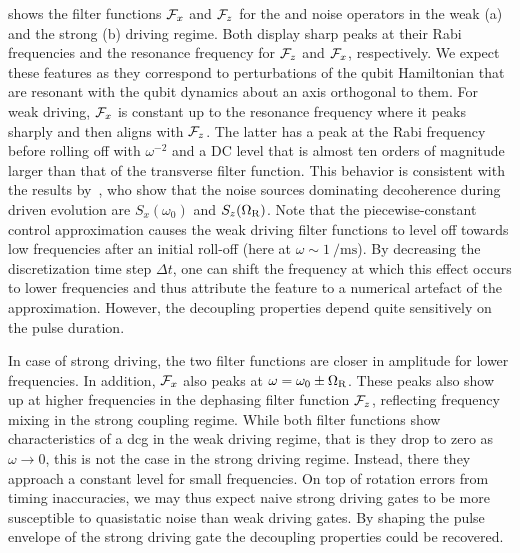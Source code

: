  shows the filter functions $\mathcal{F}_{x}$ and $\mathcal{F}_{z}$ for the \sx and \sz noise operators in the weak (a) and the strong (b) driving regime.
Both display sharp peaks at their Rabi frequencies and the resonance frequency for $\mathcal{F}_{z}$ and $\mathcal{F}_{x}$, respectively.
We expect these features as they correspond to perturbations of the qubit Hamiltonian that are resonant with the qubit dynamics about an axis orthogonal to them.
For weak driving, $\mathcal{F}_{x}$ is constant up to the resonance frequency where it peaks sharply and then aligns with $\mathcal{F}_{z}$.
The latter has a peak at the Rabi frequency before rolling off with $\omega^{-2}$ and a DC level that is almost ten orders of magnitude larger than that of the transverse filter function.
This behavior is consistent with the results by~\textcite{Yan2013}, who show that the noise sources dominating decoherence during driven evolution are $S_{x}(\omega_0)$ and $S_{z}(\Omega_{\mathrm{R}})$.
Note that the piecewise-constant control approximation causes the weak driving filter functions to level off towards low frequencies after an initial roll-off (here at $\omega\sim\qty{1}{\per\milli\second}$).
By decreasing the discretization time step $\Delta t$, one can shift the frequency at which this effect occurs to lower frequencies and thus attribute the feature to a numerical artefact of the approximation.
However, the decoupling properties depend quite sensitively on the pulse duration.

In case of strong driving, the two filter functions are closer in amplitude for lower frequencies.
In addition, $\mathcal{F}_{x}$ also peaks at $\omega = \omega_0\pm\Omega_{\mathrm{R}}$.
These peaks also show up at higher frequencies in the dephasing filter function $\mathcal{F}_{z}$, reflecting frequency mixing in the strong coupling regime.
While both filter functions show characteristics of a \gls{dcg} in the weak driving regime, that is they drop to zero as $\omega\rightarrow 0$, this is not the case in the strong driving regime.
Instead, there they approach a constant level for small frequencies.
On top of rotation errors from timing inaccuracies, we may thus expect naive strong driving gates to be more susceptible to quasistatic noise than weak driving gates.
By shaping the pulse envelope of the strong driving gate the decoupling properties could be recovered.

